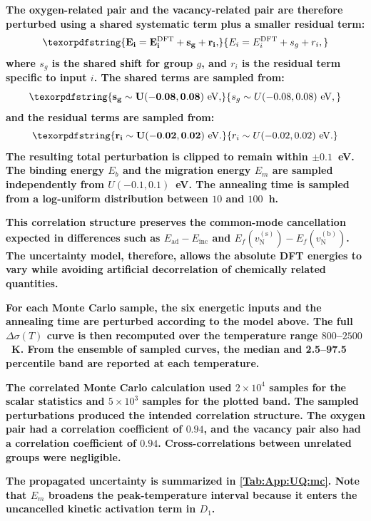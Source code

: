 \documentclass[preprint,12pt,sort&compress]{elsarticle}
\newcommand{\?}{\stackrel{?}{=}}
\providecommand{\DIFaddtex}[1]{{\bf #1}} %
\providecommand{\DIFadd}[1]{\texorpdfstring{\DIFaddtex{#1}}{#1}} %
\begin{document}
\DIFadd{The oxygen-related pair and the vacancy-related pair are therefore perturbed using a shared systematic term plus a smaller residual term:
}\begin{equation}
\DIFadd{E_i = E_i^\mathrm{DFT} + s_g + r_i,
\label{Eq:App:UQ:errormodel}
}\end{equation}
\DIFadd{where $s_g$ is the shared shift for group $g$, and $r_i$ is the residual term specific to input $i$. The shared terms are sampled from:
}\begin{equation}
\DIFadd{s_g \sim U(-0.08,0.08)~\mathrm{eV},
}\end{equation}
\DIFadd{and the residual terms are sampled from:
}\begin{equation}
\DIFadd{r_i \sim U(-0.02,0.02)~\mathrm{eV}.
}\end{equation}
\DIFadd{The resulting total perturbation is clipped to remain within $\pm0.1$~eV. The binding energy $E_b$ and the migration energy $E_m$ are sampled independently from $U(-0.1,0.1)$~eV. The annealing time is sampled from a log-uniform distribution between $10$ and $100$~h.
}

\DIFadd{This correlation structure preserves the common-mode cancellation expected in differences such as $E_\mathrm{ad}-E_\mathrm{inc}$ and $E_f(v_\mathrm{N}^{(\mathrm{s})})-E_f(v_\mathrm{N}^{(\mathrm{b})})$. The uncertainty model, therefore, allows the absolute DFT energies to vary while avoiding artificial decorrelation of chemically related quantities.
}

\DIFadd{For each Monte Carlo sample, the six energetic inputs and the annealing time are perturbed according to the model above. The full $\Delta\sigma(T)$ curve is then recomputed over the temperature range $800$--$2500$~K. From the ensemble of sampled curves, the median and 2.5--97.5 percentile band are reported at each temperature.
}

\DIFadd{The correlated Monte Carlo calculation used $2\times10^4$ samples for the scalar statistics and $5\times10^3$ samples for the plotted band. The sampled perturbations produced the intended correlation structure. The oxygen pair had a correlation coefficient of $0.94$, and the vacancy pair also had a correlation coefficient of $0.94$. Cross-correlations between unrelated groups were negligible.
}

\DIFadd{The propagated uncertainty is summarized in \cref{Tab:App:UQ:mc}. Note that $E_m$ broadens the peak-temperature interval because it enters the uncancelled kinetic activation term in $D_1$.
}
\end{document}
